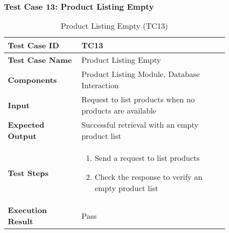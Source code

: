 \begin{table}[h]
	\subsubsection{Test Case 13: Product Listing Empty}
	\centering
	\caption{Product Listing Empty (TC13)}
	\begin{tabular}{|p{0.3\linewidth}|p{0.6\linewidth}|}
		\hline
		\textbf{Test Case ID} & TC13 \\
		\hline
		\textbf{Test Case Name} & Product Listing Empty \\
		\hline
		\textbf{Components} & Product Listing Module, Database Interaction \\
		\hline
		\textbf{Input} & Request to list products when no products are available \\
		\hline
		\textbf{Expected Output} & Successful retrieval with an empty product list \\
		\hline
		\textbf{Test Steps} & 
		\begin{enumerate}
			\item Send a request to list products
			\item Check the response to verify an empty product list
		\end{enumerate} \\
		\hline
		\textbf{Execution Result} & Pass \\
		\hline
	\end{tabular}
\end{table}

\pagebreak

